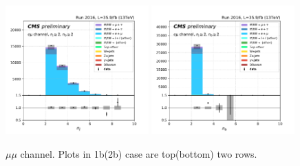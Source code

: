 \begin{figure}[ht]
    \includegraphics[width=0.49\textwidth]{chapters/Appendix/sectionPlots/figures/kinematics_pickles/emu2/2b/emu2_2b_nJets.pdf}
    \includegraphics[width=0.49\textwidth]{chapters/Appendix/sectionPlots/figures/kinematics_pickles/emu2/2b/emu2_2b_nBJets.pdf}
    
    \caption{$\mu\mu$ channel. Plots in 1b(2b) case are top(bottom) two rows.}
\end{figure}


